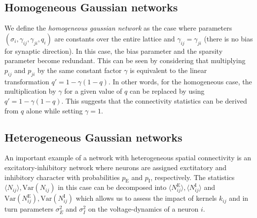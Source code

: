 \documentclass{ucetd}
\begin{document}
\subsection{Homogeneous Gaussian networks}

We define the \emph{homogeneous gaussian network} as the case where parameters $(\sigma_{i}, \gamma_{ij}, \gamma_{ji}, q_{i})$ are constants over the entire lattice and $\gamma_{ij}=\gamma_{ji}$ (there is no bias for synaptic direction). In this case, the bias parameter and the sparsity parameter become redundant. This can be seen by considering that multiplying $p_{ij}$ and $p_{ji}$ by the same constant factor $\gamma$ is equivalent to the linear transformation $q' = 1-\gamma(1-q)$. In other words, for the homogeneous case, the multiplication by $\gamma$ for a given value of $q$ can be replaced by using $q' = 1-\gamma(1-q)$. This suggests that the connectivity statistics can be derived from $q$ alone while setting $\gamma = 1$.



\subsection{Heterogeneous Gaussian networks}

An important example of a network with heterogeneous spatial connectivity is an excitatory-inhibitory network where neurons are assigned exctitatory and inhibitory character with probabilities $p_{\mathrm{E}}$ and $p_{\mathrm{I}}$, respectively. The statistics $\langle N_{ij}\rangle, \mathrm{Var}(N_{ij})$ in this case can be decomposed into $\langle N_{ij}^{\mathrm{E}}\rangle, \langle N_{ij}^{\mathrm{I}}\rangle$ and $\mathrm{Var}(N_{ij}^{\mathrm{E}}), \mathrm{Var}(N_{ij}^{\mathrm{I}})$ which allows us to assess the impact of kernels $k_{ij}$ and in turn parameters $\sigma_{E}^{2}$ and $\sigma_{I}^{2}$ on the voltage-dynamics of a neuron $i$.
\end{document}
